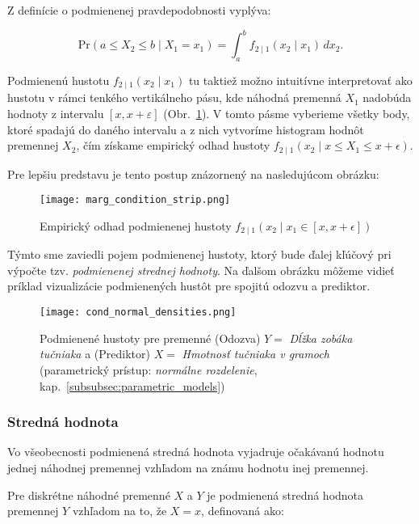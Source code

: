 Z definície o podmienenej pravdepodobnosti vyplýva:

\begin{equation}
\mathrm{Pr}(a \leq X_2 \leq b \mid X_1 = x_1) = \int_a^b f_{2 \mid 1}(x_2 \mid x_1) \, dx_2.
\end{equation}

Podmienenú hustotu $f_{2 \mid 1}(x_2 \mid x_1)$ tu taktiež možno intuitívne interpretovať ako hustotu v rámci tenkého vertikálneho pásu, kde náhodná premenná $X_1$ nadobúda hodnoty z intervalu $[x, x + \varepsilon]$ (Obr.~\ref{fig:cond_density_strip}). V tomto pásme vyberieme všetky body, ktoré spadajú do daného intervalu a z nich vytvoríme histogram hodnôt premennej $X_2$, čím získame empirický odhad hustoty $f_{2 \mid 1}(x_2 \mid x \leq X_1 \leq x +\epsilon)$.

Pre lepšiu predstavu je tento postup znázornený na nasledujúcom obrázku:

\begin{figure}[H]
    \centering
    \texttt{[image: marg\_condition\_strip.png]}
    \caption{Empirický odhad podmienenej hustoty $f_{2 \mid 1}(x_2 \mid x_1 \in [x, x + \epsilon])$}
    \label{fig:cond_density_strip}
\end{figure}

Týmto sme zaviedli pojem podmienenej hustoty, ktorý bude ďalej kľúčový pri výpočte tzv. \textit{podmienenej strednej hodnoty}. Na ďalšom obrázku môžeme vidieť príklad vizualizácie podmienených hustôt pre spojitú odozvu a prediktor.

\begin{figure}[H]
    \centering
    \texttt{[image: cond\_normal\_densities.png]}
    \caption{Podmienené hustoty pre premenné (Odozva) $Y=$ \textit{Dĺžka zobáka tučniaka} a (Prediktor) $X=$ \textit{Hmotnosť tučniaka v gramoch} (parametrický prístup: \textit{normálne rozdelenie}, kap.~\ref{subsubsec:parametric_models})}
    \label{fig:cond_normal_densities}
\end{figure}

\subsubsection{Stredná hodnota}\label{subsubsec:conditional_mean}

Vo všeobecnosti podmienená stredná hodnota vyjadruje očakávanú hodnotu jednej náhodnej premennej vzhľadom na známu hodnotu inej premennej.

Pre diskrétne náhodné premenné $X$ a $Y$ je podmienená stredná hodnota premennej $Y$ vzhľadom na to, že $X = x$, definovaná ako:

